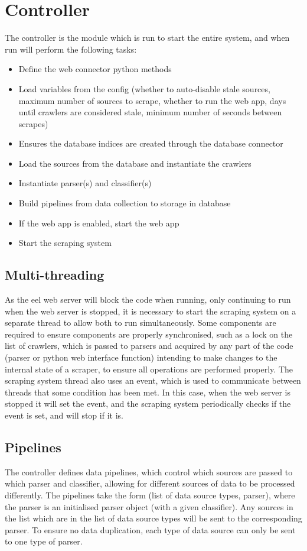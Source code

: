 \documentclass{l4proj}
\begin{document}
\section{Controller}
The controller is the module which is run to start the entire system, and when run will perform the following tasks:
\begin{itemize}
    \item Define the web connector python methods
    \item Load variables from the config (whether to auto-disable stale sources, maximum number of sources to scrape, whether to run the web app, days until crawlers are considered stale, minimum number of seconds between scrapes)
    \item Ensures the database indices are created through the database connector
    \item Load the sources from the database and instantiate the crawlers
    \item Instantiate parser(s) and classifier(s)
    \item Build pipelines from data collection to storage in database
    \item If the web app is enabled, start the web app
    \item Start the scraping system
\end{itemize}

\subsection{Multi-threading}
As the eel web server will block the code when running, only continuing to run when the web server is stopped, it is necessary to start the scraping system on a separate thread to allow both to run simultaneously. Some components are required to ensure components are properly synchronised, such as a lock on the list of crawlers, which is passed to parsers and acquired by any part of the code (parser or python web interface function) intending to make changes to the internal state of a scraper, to ensure all operations are performed properly. The scraping system thread also uses an event, which is used to communicate between threads that some condition has been met. In this case, when the web server is stopped it will set the event, and the scraping system periodically checks if the event is set, and will stop if it is. 

\subsection{Pipelines}
The controller defines data pipelines, which control which sources are passed to which parser and classifier, allowing for different sources of data to be processed differently. The pipelines take the form (list of data source types, parser), where the parser is an initialised parser object (with a given classifier). Any sources in the list which are in the list of data source types will be sent to the corresponding parser. To ensure no data duplication, each type of data source can only be sent to one type of parser.
\end{document}
